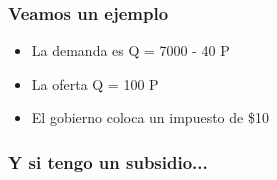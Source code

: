 \documentclass{beamer}
\begin{document}
\begin{frame}
\frametitle{Veamos un ejemplo}
\begin{itemize}
    \item La demanda es Q = 7000 - 40 P 
    \item La oferta Q = 100 P
    \item El gobierno coloca un impuesto de \$10
\end{itemize}
\end{frame}

\begin{frame}
\frametitle{Y si tengo un subsidio...}

\end{frame}
\end{document}
